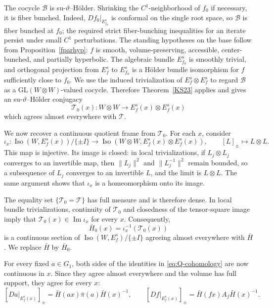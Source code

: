\documentclass[11pt]{amsart}
\numberwithin{equation}{section}
\newcommand{\GL}{\mathrm{GL}}
\theoremstyle{plain}
\begin{document}
The cocycle $\mathcal B$ is su-$\vartheta$--H\"older. Shrinking the
$C^1$-neighborhood of $f_0$ if necessary, it is fiber bunched. Indeed,
$Df_0|_{E_{f_0}^s}$ is conformal on the single root space, so
$\mathcal B$ is fiber bunched at $f_0$; the required strict
fiber-bunching inequalities for an iterate persist under small
$C^1$ perturbations.  The standing hypotheses on the base follow from
Proposition~\ref{fparhyp}: $f$ is smooth,
volume-preserving, accessible, center-bunched, and partially
hyperbolic.  The algebraic bundle $E_{f_0}^s$ is smoothly trivial, and
orthogonal projection from $E_f^s$ to $E_{f_0}^s$ is a H\"older bundle
isomorphism for $f$ sufficiently close to $f_0$.  We use the induced
trivialization of $E_f^s\otimes E_f^s$ to regard $\mathcal B$ as a
$\GL(W\otimes W)$-valued cocycle.  Therefore
Theorem~\ref{KS23} applies and gives an su-$\vartheta$--H\"older
conjugacy
\[
\mathcal T_0(x):W\otimes W\longrightarrow
E_f^s(x)\otimes E_f^s(x)
\]
which agrees almost everywhere with $\mathcal T$.

We now recover a continuous quotient frame from $\mathcal T_0$. For each $x$,
consider
\[
\iota_x:
\operatorname{Iso}(W,E_f^s(x))/\{\pm I\}
 \longrightarrow
\operatorname{Iso}(W\otimes W,E_f^s(x)\otimes E_f^s(x)),
\qquad
[L]_\pm\longmapsto L\otimes L.
\]
This map is injective. Its image is closed: in local trivializations,
if $L_j\otimes L_j$ converges to an invertible map, then
$\|L_j\|^2$ and $\|L_j^{-1}\|^2$ remain bounded, so a subsequence of
$L_j$ converges to an invertible $L$, and the limit is $L\otimes L$.
The same argument shows that $\iota_x$ is a homeomorphism onto its
image.

The equality set $\{\mathcal T_0=\mathcal T\}$ has full measure and is therefore dense.
In local bundle trivializations, continuity of $\mathcal T_0$ and closedness
of the tensor-square image imply that
$\mathcal T_0(x)\in\operatorname{Im}\iota_x$ for every $x$. Consequently,
\[
\bar H_0(x)=\iota_x^{-1}(\mathcal T_0(x))
\]
is a continuous section of
$\operatorname{Iso}(W,E_f^s)/\{\pm I\}$ agreeing almost everywhere
with $\bar H$. We replace $\bar H$ by $\bar H_0$.

For every fixed $a\in G_1$, both sides of the identities in
\eqref{eq:Q-cohomology} are now continuous in $x$. Since they agree
almost everywhere and the volume has full support, they agree for
every $x$:
\begin{equation}\label{eq:continuous-Q-cohomology}
[Da|_{E_f^s(x)}]_\pm
 =\bar H(ax)\bar\pi(a)\bar H(x)^{-1},
\qquad
[Df|_{E_f^s(x)}]_\pm
 =\bar H(fx)A_f\bar H(x)^{-1}.
\end{equation}
\end{document}
